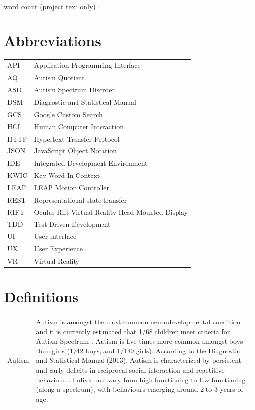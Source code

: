 \documentclass[a4paper, 11pt]{article}
\begin{document}
\begin{center}
word count (project text only) :
\end{center}

\clearpage
\tableofcontents
\clearpage

\section*{Abbreviations}
\begin{tabular}{l l }
API & Application Programming Interface\\
AQ & Autism Quotient\\
ASD & Autism Spectrum Disorder\\
DSM & Diagnostic and Statistical Manual\\
GCS & Google Custom Search\\
HCI & Human Computer Interaction\\
HTTP & Hypertext Transfer Protocol\\
JSON & JavaScript Object Notation\\
IDE & Integrated Development Environment\\
KWIC & Key Word In Context\\
LEAP & LEAP Motion Controller\\
REST & Representational state transfer\\
RIFT & Oculus Rift Virtual Reality Head Mounted Display\\
TDD & Test Driven Development\\
UI & User Interface\\
UX & User Experience\\
VR & Virtual Reality\\
\end{tabular}

\section*{Definitions}

\begin{tabular}{l p{15cm}  }
Autism & Autism is amongst the most common neurodevelopmental condition and it is currently estimated that 1/68 children meet criteria for Autism Spectrum \cite{CDC}. Autism is five times more common amongst boys than girls (1/42 boys, and 1/189 girls). According to the Diagnostic and Statistical Manual (2013), Autism is characterized by persistent and early deficits in reciprocal social interaction and repetitive behaviours. Individuals vary from high functioning to low functioning (along a spectrum), with behaviours emerging around 2 to 3 years of age.
\end{tabular}
\clearpage
\end{document}
